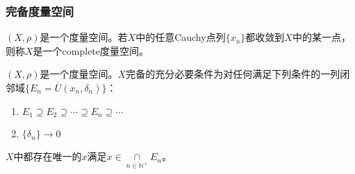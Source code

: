\subsubsection{完备度量空间}
\begin{definition}
	$(X,\rho)$是一个度量空间。若$X$中的任意Cauchy点列$\{x_n\}$都收敛到$X$中的某一点，则称$X$是一个\gls{complete}度量空间。
\end{definition}
\begin{theorem}[闭球套定理]
	$(X,\rho)$是一个度量空间。$X$完备的充分必要条件为对任何满足下列条件的一列闭邻域$\{E_n=\overline{U}(x_n,\delta_n)\}$：
	\begin{enumerate}
		\item $E_1\supseteq E_2\supseteq\cdots\supseteq E_n\supseteq\cdots$
		\item $\{\delta_n\}\to0$
	\end{enumerate}
	$X$中都存在唯一的$x$满足$x\in\underset{n\in\mathbb{N}^+}{\cap}E_n$。
\end{theorem}
